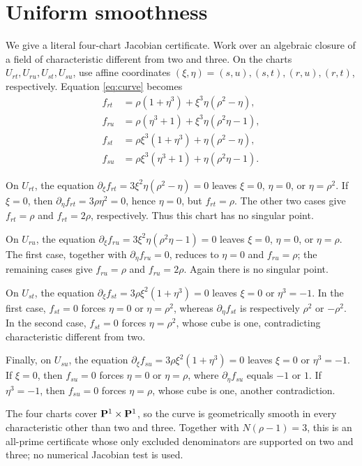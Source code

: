 \section{Uniform smoothness}\label{sec:smooth}

We give a literal four-chart Jacobian certificate.  Work over an algebraic
closure of a field of characteristic different from two and three.  On the
charts \(U_{rt},U_{ru},U_{st},U_{su}\), use affine coordinates
\((\xi,\eta)=(s,u),(s,t),(r,u),(r,t)\), respectively.  Equation
\eqref{eq:curve} becomes
\begin{align*}
 f_{rt}&=\rho(1+\eta^3)+\xi^3\eta(\rho^2-\eta),\\
 f_{ru}&=\rho(\eta^3+1)+\xi^3\eta(\rho^2\eta-1),\\
 f_{st}&=\rho\xi^3(1+\eta^3)+\eta(\rho^2-\eta),\\
 f_{su}&=\rho\xi^3(\eta^3+1)+\eta(\rho^2\eta-1).
\end{align*}

On \(U_{rt}\), the equation
\(\partial_\xi f_{rt}=3\xi^2\eta(\rho^2-\eta)=0\) leaves
\(\xi=0\), \(\eta=0\), or \(\eta=\rho^2\).  If \(\xi=0\), then
\(\partial_\eta f_{rt}=3\rho\eta^2=0\), hence \(\eta=0\), but
\(f_{rt}=\rho\).  The other two cases give \(f_{rt}=\rho\) and
\(f_{rt}=2\rho\), respectively.  Thus this chart has no singular point.

On \(U_{ru}\), the equation
\(\partial_\xi f_{ru}=3\xi^2\eta(\rho^2\eta-1)=0\) leaves
\(\xi=0\), \(\eta=0\), or \(\eta=\rho\).  The first case, together with
\(\partial_\eta f_{ru}=0\), reduces to \(\eta=0\) and
\(f_{ru}=\rho\); the remaining cases give \(f_{ru}=\rho\) and
\(f_{ru}=2\rho\).  Again there is no singular point.

On \(U_{st}\), the equation
\(\partial_\xi f_{st}=3\rho\xi^2(1+\eta^3)=0\) leaves \(\xi=0\)
or \(\eta^3=-1\).  In the first case, \(f_{st}=0\) forces
\(\eta=0\) or \(\eta=\rho^2\), whereas
\(\partial_\eta f_{st}\) is respectively \(\rho^2\) or
\(-\rho^2\).  In the second case, \(f_{st}=0\) forces
\(\eta=\rho^2\), whose cube is one, contradicting characteristic different
from two.

Finally, on \(U_{su}\), the equation
\(\partial_\xi f_{su}=3\rho\xi^2(1+\eta^3)=0\) leaves \(\xi=0\)
or \(\eta^3=-1\).  If \(\xi=0\), then \(f_{su}=0\) forces
\(\eta=0\) or \(\eta=\rho\), where \(\partial_\eta f_{su}\) equals
\(-1\) or \(1\).  If \(\eta^3=-1\), then \(f_{su}=0\) forces
\(\eta=\rho\), whose cube is one, another contradiction.

The four charts cover \(\mathbf P^1\times\mathbf P^1\), so the curve is geometrically
smooth in every characteristic other than two and three.  Together with
\(N(\rho-1)=3\), this is an all-prime certificate whose only excluded
denominators are supported on two and three; no numerical Jacobian test is
used.
